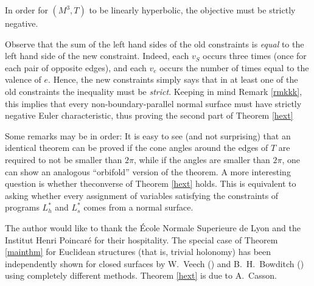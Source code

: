 \documentclass{acmart}
\begin{document}
{In order for $(M^3, T)$ to be linearly hyperbolic, the objective must
be strictly negative.

Observe that the sum of the left hand sides of the old constraints is
\emph{equal} to the left hand side of the new constraint. Indeed, each
$v_S$ occurs three times (once for each pair of opposite edges), and
each $v_e$ occurs the number of times equal to the valence of
$e$. Hence, the new constraints simply says that in at least one of
the old constraints the inequality must be \emph{strict}. Keeping in
mind Remark \ref{rmkkk}, this implies that every non-boundary-parallel
normal surface must have strictly negative Euler characteristic, thus
proving the second part of Theorem \ref{hext}
}

Some remarks may be in order: 
It is easy to see (and not surprising) that an identical theorem can
be proved if the cone angles around the edges of $T$ are required to
not be smaller than $2\pi$, while if the angles are smaller than
$2\pi$, one can show an analogous ``orbifold'' version of the theorem.
A more interesting question is whether theconverse of Theorem
\ref{hext} holds. This is equivalent to asking whether every
assignment of variables satisfying the constraints of programs $L_h^*$
and $L_s^*$ comes from a normal surface. 

\begin{acks}
The author would like to thank the \'Ecole Normale Superieure de Lyon
and the Institut Henri Poincar\'e for their hospitality. The special
case of Theorem \ref{mainthm} for Euclidean structures (that is,
trivial holonomy) has been independently shown for closed surfaces by
W.~Veech (\cite{veech}) and B.~H.~Bowditch (\cite{bhb}) using
completely different methods. Theorem \ref{hext} is due to A.~Casson. 
\end{acks}
\end{document}
